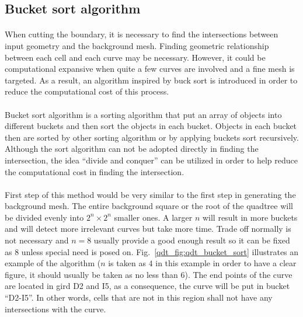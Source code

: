 \subsection{Bucket sort algorithm}
\paragraph{}
When cutting the boundary, it is necessary to find the intersections between input geometry and the background mesh.
Finding geometric relationship between each cell and each curve may be necessary.
However, it could be computational expansive when quite a few curves are involved and a fine mesh is targeted.
As a result, an algorithm inspired by buck sort is introduced in order to reduce the computational cost of this process.
\paragraph{}
Bucket sort algorithm is a sorting algorithm that put an array of objects into different buckets and then sort the objects in each bucket.
Objects in each bucket then are sorted by other sorting algorithm or by applying buckets sort recursively.
Although the sort algorithm can not be adopted directly in finding the intersection, the idea ``divide and conquer'' can be utilized in order to help reduce the computational cost in finding the intersection.
\paragraph{}
First step of this method would be very similar to the first step in generating the background mesh.
The entire background square or the root of the quadtree will be divided evenly into $2^n \times 2^n$ smaller ones.
A larger $n$ will result in more buckets and will detect more irrelevant curves but take more time.
Trade off normally is not necessary and $n=8$ usually provide a good enough result so it can be fixed as $8$ unless special need is posed on.
Fig.~\ref{qdt_fig:qdt_bucket_sort} illustrates an example of the algorithm ($n$ is taken as $4$ in this example in order to have a clear figure, it should usually be taken as no less than $6$).
The end points of the curve are located in gird D2 and I5, as a consequence, the curve will be put in bucket ``D2-I5''.
In other words, cells that are not in this region shall not have any intersections with the curve.

